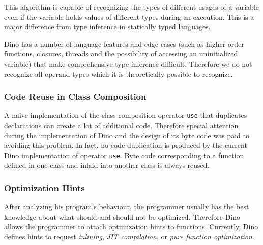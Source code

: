 \documentclass[preprint]{sigplanconf}
\begin{document}
  This algorithm is capable of recognizing the types of different usages of a variable
even if the variable holds values of different types during an execution.  This is a major difference from type inference in statically typed languages.

  Dino has a number of language features and edge cases (such as higher order functions, closures, threads and the possibility of accessing an uninitialized variable) that make comprehensive type inference difficult.
Therefore we do not
recognize all operand types which it is theoretically possible to recognize.

\subsubsection{Code Reuse in Class Composition}

  A naive implementation of the class composition operator {\tt use} that duplicates declarations
can create a lot of additional code.  Therefore special attention during the
implementation of Dino and the design of its byte code was paid to avoiding this
problem.  In fact, no code duplication is produced by the current
Dino implementation of operator {\tt use}.  Byte code corresponding to a function defined in one class
and inlaid into another class is always reused.

\subsubsection{Optimization Hints}

After analyzing his program's behaviour, the programmer usually has the best knowledge
about what should and should not be optimized.
Therefore Dino allows the programmer to attach optimization hints to functions. Currently,
Dino defines hints to request \emph{inlining}, \emph{JIT compilation}, or \emph{pure
function optimization}.
\end{document}
